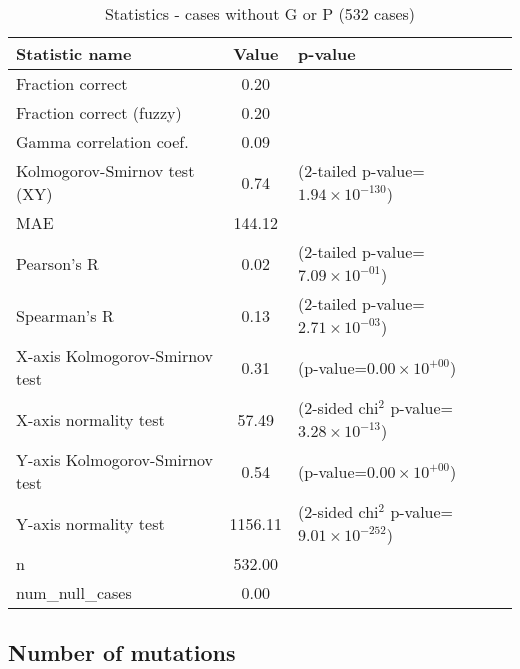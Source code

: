 \documentclass[10pt, letterpaper, oneside, titlepage, landscape]{scrreprt}
\begin{document}
\begin{table}[H]\begin{center}
\begin{tabular}{ l S[table-format=3.2] l}
Statistic name & {Value} & p-value\\
\hline
Fraction correct & 0.20 & \\
Fraction correct (fuzzy) & 0.20 & \\
Gamma correlation coef. & 0.09 & \\
Kolmogorov-Smirnov test (XY) & 0.74 & (2-tailed p-value=$1.94\times10^{-130}$)\\
MAE & 144.12 & \\
Pearson's R & 0.02 & (2-tailed p-value=$7.09\times10^{-01}$)\\
Spearman's R & 0.13 & (2-tailed p-value=$2.71\times10^{-03}$)\\
X-axis Kolmogorov-Smirnov test & 0.31 & (p-value=$0.00\times10^{+00}$)\\
X-axis normality test & 57.49 & (2-sided chi$^{2}$ p-value=$3.28\times10^{-13}$)\\
Y-axis Kolmogorov-Smirnov test & 0.54 & (p-value=$0.00\times10^{+00}$)\\
Y-axis normality test & 1156.11 & (2-sided chi$^{2}$ p-value=$9.01\times10^{-252}$)\\
n & 532.00 & \\
num\_null\_cases & 0.00 & \\
\end{tabular}
\caption{Statistics - cases without G or P (532 cases)}
\end{center}\end{table}


\subsection{Number of mutations}
\end{document}
